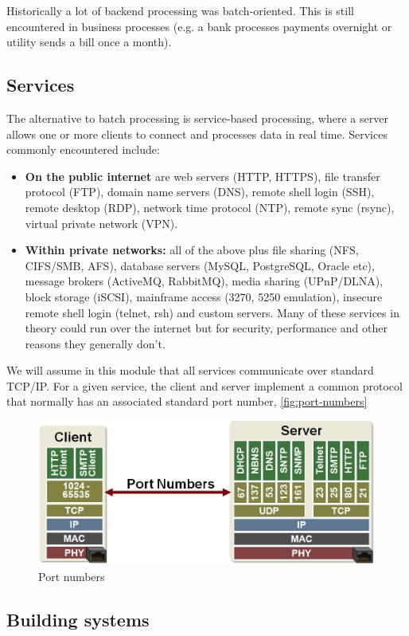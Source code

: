 \documentclass{pgnotes}
\begin{document}
Historically a lot of backend processing was batch-oriented.
This is still encountered in business processes (e.g. a bank processes payments overnight or utility sends a bill once a month).

\subsection{Services}
\label{sec:services}

The alternative to batch processing is service-based processing, where a server allows one or more clients to connect and processes data in real time. 
Services commonly encountered include:
\begin{itemize}
\item \textbf{On the public internet} are web servers (HTTP, HTTPS), file transfer protocol (FTP), domain name servers (DNS), remote shell login (SSH), remote desktop (RDP), network time protocol (NTP), remote sync (rsync), virtual private network (VPN). 
\item \textbf{Within private networks:} all of the above plus file sharing (NFS, CIFS/SMB, AFS), database servers (MySQL, PostgreSQL, Oracle etc), message brokers (ActiveMQ, RabbitMQ), media sharing (UPnP/DLNA), block storage (iSCSI), mainframe access (3270, 5250 emulation), insecure remote shell login (telnet, rsh) and custom servers.
  Many of these services in theory could run over the internet but for security, performance and other reasons they generally don't.
\end{itemize}
  
We will assume in this module that all services communicate over standard TCP/IP. 
For a given service, the client and server implement a common protocol that normally has an associated standard port number, \autoref{fig:port-numbers}

\begin{figure}[htbp]
  \centering
  \includegraphics[width=0.5\linewidth]{port_numbers}
  \caption{Port numbers}
  \label{fig:port-numbers}
\end{figure}

\subsection{Building systems}
\label{sec:building-systems}
\end{document}
